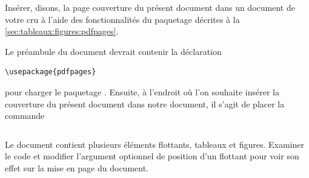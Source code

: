 \begin{exercice}
  Insérer, disons, la page couverture du présent document dans un
  document de votre cru à l'aide des fonctionnalités du paquetage
   décrites à la \autoref{sec:tableaux:figures:pdfpages}.
  \begin{sol}
    Le préambule du document devrait contenir la déclaration
\begin{lstlisting}
\usepackage{pdfpages}
\end{lstlisting}
    pour charger le paquetage . Ensuite, à l'endroit où
    l'on souhaite insérer la couverture du présent document dans notre
    document, il s'agit de placer la commande
\begin{lstlisting}

\end{lstlisting}
  \end{sol}
\end{exercice}

\begin{exercice}[nosol]
  Le document  contient plusieurs éléments
  flottants, tableaux et figures. Examiner le code et modifier
  l'argument optionnel de position d'un flottant pour voir son effet
  sur la mise en page du document.
\end{exercice}



